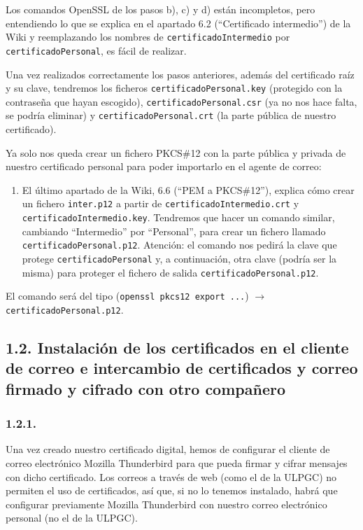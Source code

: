 Los comandos OpenSSL de los pasos b), c) y d) están incompletos, pero entendiendo lo que se explica en el
apartado 6.2 (``Certificado intermedio'') de la Wiki y reemplazando los nombres de
\texttt{certificadoIntermedio} por \texttt{certificadoPersonal}, es fácil de realizar.

Una vez realizados correctamente los pasos anteriores, además del certificado raíz y su clave, tendremos los
ficheros \texttt{certificadoPersonal.key} (protegido con la contraseña que hayan escogido),
\texttt{certificadoPersonal.csr} (ya no nos hace falta, se podría eliminar) y \texttt{certificadoPersonal.crt}
(la parte pública de nuestro certificado).

Ya solo nos queda crear un fichero PKCS\#12 con la parte pública y privada de nuestro certificado personal
para poder importarlo en el agente de correo:

\begin{enumerate}[label=\alph*), start=5]
    \item El último apartado de la Wiki, 6.6 (``PEM a PKCS\#12''), explica cómo crear un fichero
    \texttt{inter.p12} a partir de \texttt{certificadoIntermedio.crt} y \texttt{certificadoIntermedio.key}.
    Tendremos que hacer un comando similar, cambiando ``Intermedio'' por ``Personal'', para crear un fichero
    llamado \texttt{certificadoPersonal.p12}. Atención: el comando nos pedirá la clave que protege
    \texttt{certificadoPersonal} y, a continuación, otra clave (podría ser la misma) para proteger el fichero
    de salida \texttt{certificadoPersonal.p12}.
\end{enumerate}

El comando será del tipo (\texttt{openssl pkcs12 export ...}) $\rightarrow$ \texttt{certificadoPersonal.p12}.

\subsection*{1.2. Instalación de los certificados en el cliente de correo e intercambio de certificados y correo firmado y cifrado con otro compañero}

\subsubsection*{1.2.1.}
Una vez creado nuestro certificado digital, hemos de configurar el cliente de correo electrónico Mozilla
Thunderbird para que pueda firmar y cifrar mensajes con dicho certificado. Los correos a través de web
(como el de la ULPGC) no permiten el uso de certificados, así que, si no lo tenemos instalado, habrá que
configurar previamente Mozilla Thunderbird con nuestro correo electrónico personal (no el de la ULPGC).


